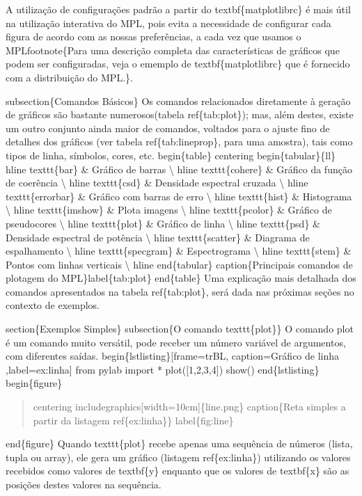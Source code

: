 \documentclass[a4paper,10pt,brazil]{sphinxmanual}
\begin{document}
A utilização de configurações padrão a partir do textbf\{matplotlibrc\} é mais útil na utilização interativa do MPL, pois evita a necessidade de configurar cada figura de acordo com as nossas preferências, a cada vez que usamos o MPLfootnote\{Para uma descrição completa das características de gráficos que podem ser configuradas, veja o ememplo de textbf\{matplotlibrc\} que é fornecido com a distribuição do MPL.\}.

subsection\{Comandos Básicos\}
Os comandos relacionados diretamente à geração de gráficos são bastante numerosos(tabela ref\{tab:plot\}); mas, além  destes, existe um outro conjunto ainda maior de comandos, voltados para o ajuste fino de detalhes dos gráficos (ver tabela ref\{tab:lineprop\}, para uma amostra), tais como tipos de linha, símbolos, cores, etc.
begin\{table\}
centering
begin\{tabular\}\{l\textbar{}l\}
hline texttt\{bar\} \& Gráfico de barras \textbackslash{}
hline texttt\{cohere\} \& Gráfico da função de coerência \textbackslash{}
hline texttt\{csd\} \& Densidade espectral cruzada \textbackslash{}
hline texttt\{errorbar\} \& Gráfico com barras de erro \textbackslash{}
hline texttt\{hist\} \& Histograma \textbackslash{}
hline texttt\{imshow\} \& Plota imagens \textbackslash{}
hline texttt\{pcolor\} \& Gráfico de pseudocores \textbackslash{}
hline texttt\{plot\} \& Gráfico de linha \textbackslash{}
hline texttt\{psd\} \& Densidade espectral de potência \textbackslash{}
hline texttt\{scatter\} \& Diagrama de espalhamento \textbackslash{}
hline texttt\{specgram\} \& Espectrograma \textbackslash{}
hline texttt\{stem\} \& Pontos com linhas verticais \textbackslash{}
hline
end\{tabular\}
caption\{Principais comandos de plotagem do MPL\}label\{tab:plot\}
end\{table\}
Uma explicação mais detalhada dos comandos apresentados na tabela ref\{tab:plot\}, será dada nas próximas seções no contexto de exemplos.

section\{Exemplos Simples\}
subsection\{O comando texttt\{plot\}\}
O comando plot é um comando muito versátil, pode receber um número variável de argumentos, com diferentes saídas.
begin\{lstlisting\}{[}frame=trBL, caption=Gráfico de linha ,label=ex:linha{]}
from pylab import *
plot({[}1,2,3,4{]})
show()
end\{lstlisting\}
begin\{figure\}
\begin{quote}

centering
includegraphics{[}width=10cm{]}\{line.png\}
caption\{Reta simples a partir da listagem ref\{ex:linha\}\}
label\{fig:line\}
\end{quote}

end\{figure\}
Quando texttt\{plot\} recebe apenas uma sequência de números (lista, tupla ou array), ele gera um gráfico (listagem ref\{ex:linha\}) utilizando os valores recebidos como valores de textbf\{y\} enquanto que os valores de textbf\{x\} são as posições destes valores na sequência.
\end{document}
